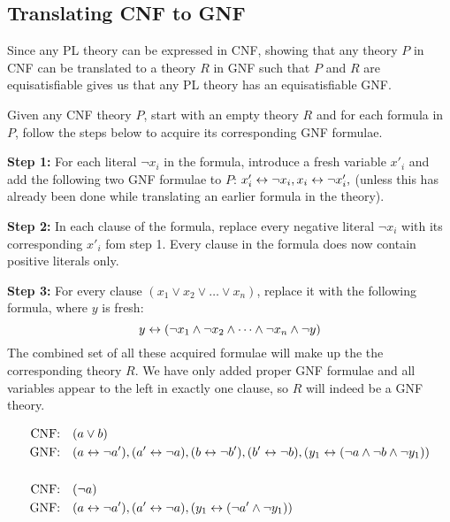 \subsection{Translating CNF to GNF}
\label{sub:Translating CNF to GNF}
Since any PL theory can be expressed in CNF, showing that any theory $P$ in CNF can be translated to a theory $R$ in GNF such that $P$ and $R$ are equisatisfiable gives us that any PL theory has an equisatisfiable GNF.

Given any CNF theory $P$, start with an empty theory $R$ and for each formula in $P$, follow the steps below to acquire its corresponding GNF formulae.

\textbf{Step 1:}
For each literal $\neg x_i$ in the formula, introduce a fresh variable $x'_i$ and add the following two GNF formulae to $P$:
$x'_i \leftrightarrow \neg x_i, x_i \leftrightarrow \neg x'_i,$ (unless this has already been done while translating an earlier formula in the theory).

\textbf{Step 2:}
In each clause of the formula, replace every negative literal $\neg x_i$ with its corresponding $x'_i$ fom step 1.
Every clause in the formula does now contain positive literals only.

\textbf{Step 3:}
For every clause $(x_1 \vee x_2 \vee \dots \vee x_n)$, replace it with the following formula, where $y$ is fresh:
\[y \leftrightarrow (\neg x_1 \wedge \neg x_2 \wedge \dots \wedge \neg x_n \wedge \neg y)\]
The combined set of all these acquired formulae will make up the the corresponding theory $R$.
We have only added proper GNF formulae and all variables appear to the left in exactly one clause, so $R$ will indeed be a GNF theory.\\

\begin{example}
  \begin{align}
    \text{CNF:\quad}& ( a \vee b )\\
    \text{GNF:\quad}& ( a \leftrightarrow \neg a'), (a' \leftrightarrow \neg a), (b \leftrightarrow \neg b'), (b' \leftrightarrow \neg b), (y_1 \leftrightarrow (\neg a \wedge \neg b \wedge \neg y_1))\\
    \\
    \text{CNF:\quad}& (\neg a)\\
    \text{GNF:\quad}& ( a \leftrightarrow \neg a'), (a' \leftrightarrow \neg a), (y_1 \leftrightarrow (\neg a' \wedge \neg y_1))\\
  \end{align}
\end{example}
